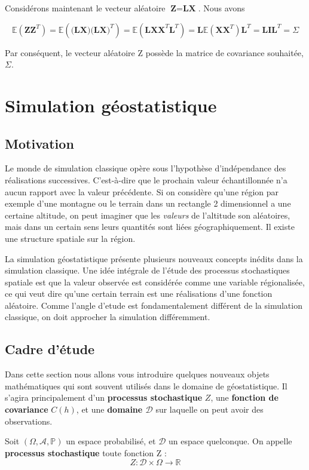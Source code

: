 \documentclass[10pt]{article} %
\begin{document}
Considérons maintenant le vecteur aléatoire $\textbf{Z} = \textbf{LX}$. Nous avons

 $$ \mathbb{E}(\textbf{ZZ}^T) = \mathbb{E}(\textbf{(LX)(LX)}^T) = \mathbb{E}(\textbf{LXX}^{T}\textbf{L}^{T}) =
 \textbf{L}\mathbb{E}(\textbf{XX}^{T})\textbf{L}^{T} = \textbf{LIL}^{T} = \Sigma $$

Par conséquent, le vecteur aléatoire Z possède la matrice de covariance souhaitée, $ \Sigma $.


\section{Simulation géostatistique}

\subsection{Motivation}

Le monde de simulation classique opère sous l'hypothèse d'indépendance des réalisations successives. C'est-à-dire que le prochain
valeur échantillonnée n'a aucun rapport avec la valeur précédente. Si on considère qu'une région par exemple d'une montagne ou le terrain
dans un rectangle 2 dimensionnel a une certaine altitude, on peut imaginer que les \textit{valeurs} de l'altitude son aléatoires, mais dans un
certain sens leurs quantités sont liées géographiquement. Il existe une structure spatiale sur la région.

La simulation géostatistique présente plusieurs nouveaux concepts inédits dans la simulation classique. Une idée intégrale de l'étude des processus
stochastiques spatiale est que la valeur observée est considérée comme une variable régionalisée, ce qui veut dire qu'une certain terrain
est une réalisations d'une fonction aléatoire. Comme l'angle d'etude est fondamentalement différent de la simulation classique, on doit approcher la simulation
différemment.

\subsection{Cadre d'étude}
Dans cette section nous allons vous introduire quelques nouveaux objets mathématiques qui sont souvent utilisés dans le domaine
de géostatistique. Il s'agira principalement d'un \textbf{processus stochastique} $Z$, une \textbf{fonction de covariance} $C(h)$, et une \textbf{domaine $\mathcal{D}$} sur laquelle
on peut avoir des observations.

\begin{definition}
    Soit $(\Omega, \mathcal{A}, \mathbb{P})$ un espace probabilisé, et $\mathcal{D}$ un espace quelconque. On appelle
    \textbf{processus stochastique} toute fonction Z :
    $$ Z : \mathcal{D} \times \Omega \to \mathbb{R} $$
\end{definition}
\end{document}
